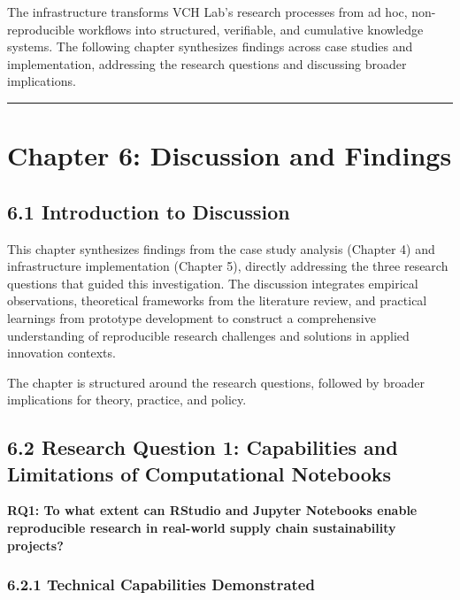 \documentclass[
  oneside,
  open=any]{scrbook}
\begin{document}
The infrastructure transforms VCH Lab's research processes from ad hoc,
non-reproducible workflows into structured, verifiable, and cumulative
knowledge systems. The following chapter synthesizes findings across
case studies and implementation, addressing the research questions and
discussing broader implications.

\begin{center}\rule{0.5\linewidth}{0.5pt}\end{center}

\chapter{Chapter 6: Discussion and
Findings}\label{chapter-6-discussion-and-findings}

\section{6.1 Introduction to
Discussion}\label{introduction-to-discussion}

This chapter synthesizes findings from the case study analysis (Chapter
4) and infrastructure implementation (Chapter 5), directly addressing
the three research questions that guided this investigation. The
discussion integrates empirical observations, theoretical frameworks
from the literature review, and practical learnings from prototype
development to construct a comprehensive understanding of reproducible
research challenges and solutions in applied innovation contexts.

The chapter is structured around the research questions, followed by
broader implications for theory, practice, and policy.

\section{6.2 Research Question 1: Capabilities and Limitations of
Computational
Notebooks}\label{research-question-1-capabilities-and-limitations-of-computational-notebooks}

\textbf{RQ1: To what extent can RStudio and Jupyter Notebooks enable
reproducible research in real-world supply chain sustainability
projects?}

\subsection{6.2.1 Technical Capabilities
Demonstrated}\label{technical-capabilities-demonstrated}
\end{document}
